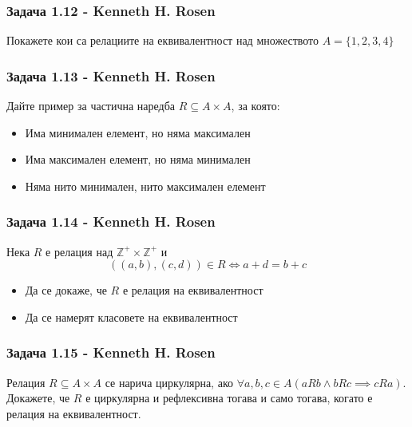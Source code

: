\documentclass[12pt]{article}
\begin{document}
\subsubsection*{Задача 1.12 - Kenneth H. Rosen}
Покажете кои са релациите на еквивалентност над множеството $A = \{ 1, 2, 3, 4 \}$

\subsubsection*{Задача 1.13 - Kenneth H. Rosen}
Дайте пример за частична наредба $R \subseteq A \times A$, за която:
\begin{itemize}
    \item Има минимален елемент, но няма максимален
    \item Има максимален елемент, но няма минимален
    \item Няма нито минимален, нито максимален елемент
\end{itemize}

\subsubsection*{Задача 1.14 - Kenneth H. Rosen}
Нека $R$ е релация над $\mathbb{Z}^+ \times \mathbb{Z}^+$ и 
\begin{equation*}
    ((a, b), (c, d)) \in R \iff a + d = b + c
\end{equation*}
\begin{itemize}
    \item Да се докаже, че $R$ е релация на еквивалентност
    \item Да се намерят класовете на еквивалентност
\end{itemize} 

\subsubsection*{Задача 1.15 - Kenneth H. Rosen}
Релация $R \subseteq A \times A$ се нарича циркулярна, ако $\forall a, b, c \in A(aRb \land bRc \implies cRa)$. 
Докажете, че $R$ е циркулярна и рефлексивна тогава и само тогава, когато е релация на еквивалентност.
\end{document}

